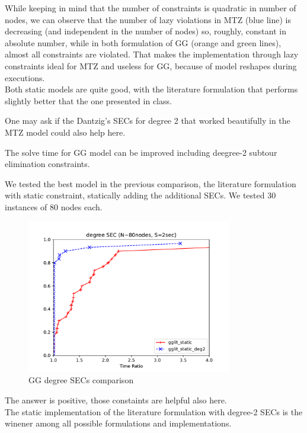 While keeping in mind that the number of constraints is quadratic in number of
nodes, we can observe that the number of lazy violations in MTZ (blue line) is
decreasing (and independent in the number of nodes) so, roughly, constant in
absolute number, while in both formulation of GG  (orange and green lines),
almost all constraints are violated. That makes the implementation through lazy
constraints ideal for MTZ and useless for GG, because of model reshapes during
executions.\\

Both static models are quite good, with the literature formulation that performs
slightly better that the one presented in class.


One may ask if the Dantzig's SECs for degree 2 that worked beautifully in the MTZ
model could also help here.

\begin{claim} 
    The solve time for GG model can be improved including deegree-2 subtour
    elimination constraints.
\end{claim}

We tested the best model in the previous comparison, the literature formulation
with static constraint, statically adding the additional SECs. We tested 30
instances of 80 nodes each.

\begin{figure}[h]
    \centering
    \includegraphics[width=0.8\textwidth]{figures/gg_comp2}
    \caption{GG degree SECs comparison}
\end{figure}

The answer is positive, those constaints are helpful also here. \\ 

The static implementation of the literature formulation with degree-2 SECs
is the winener among all possible formulations and implementations.


